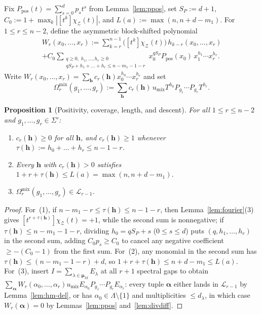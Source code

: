 \documentclass[11pt,a4paper]{article}
\newtheorem{proposition}[theorem]{Proposition}
\theoremstyle{definition}
\theoremstyle{remark}
\newcommand{\cL}{\mathcal{L}}
\newcommand{\cZ}{\mathcal{Z}}
\newcommand{\bmu}{\boldsymbol{\mu}}
\begin{document}
Fix $P_{\mathrm{pos}}(t) = \sum_{s=0}^d p_s t^s$ from Lemma~\ref{lem:ppos}, set $S_P := d + 1$, $C_0 := 1 + \max_k |[t^k]\chi_\cZ(t)|$, and $L(a) := \max(n, n + d - m_1)$. For $1 \le r \le n - 2$, define the asymmetric block-shifted polynomial
\begin{multline}
  W_r(x_0, \dots, x_r) := \sum_{k=r}^{n-1} \bigl([t^k]\chi_\cZ(t)\bigr)\, h_{k-r}(x_0, \dots, x_r) \\
  + C_0 \sum_{\substack{q \ge 0,\; h_1, \dots, h_r \ge 0 \\ q S_P + h_1 + \dots + h_r \le n - m_1 - 1 - r}} x_0^{q S_P} P_{\mathrm{pos}}(x_0)\, x_1^{h_1} \cdots x_r^{h_r}.
  \label{eq:Wr}
\end{multline}
Write $W_r(x_0, \dots, x_r) = \sum_{\mathbf{h}} c_r(\mathbf{h}) x_0^{h_0} \cdots x_r^{h_r}$ and set
\[
  \Omega_r^{\mathrm{mix}}(g_1, \dots, g_r) := \sum_{\mathbf{h}} c_r(\mathbf{h})\, u_{\mathrm{mix}} T^{h_0} P_{g_1} \cdots P_{g_r} T^{h_r}.
\]

\begin{proposition}[Positivity, coverage, length, and descent]
\label{prop:Wr}
For all $1 \le r \le n - 2$ and $g_1, \dots, g_r \in \Sigma'$:
\begin{enumerate}[label=(\arabic*),nosep]
  \item $c_r(\mathbf{h}) \ge 0$ for all $\mathbf{h}$, and $c_r(\mathbf{h}) \ge 1$ whenever $\tau(\mathbf{h}) := h_0 + \dots + h_r \le n - 1 - r$.
  \item Every $\mathbf{h}$ with $c_r(\mathbf{h}) > 0$ satisfies $1 + r + \tau(\mathbf{h}) \le L(a) = \max(n, n + d - m_1)$.
  \item $\Omega_r^{\mathrm{mix}}(g_1, \dots, g_r) \in \cL_{r-1}$.
\end{enumerate}
\end{proposition}
\begin{proof}
For~(1), if $n - m_1 - r \le \tau(\mathbf{h}) \le n - 1 - r$, then Lemma~\ref{lem:fourier}(3) gives $[t^{r+\tau(\mathbf{h})}]\chi_\cZ(t) = +1$, while the second sum is nonnegative; if $\tau(\mathbf{h}) \le n - m_1 - 1 - r$, dividing $h_0 = q S_P + s$ ($0 \le s \le d$) puts $(q, h_1, \dots, h_r)$ in the second sum, adding $C_0 p_s \ge C_0$ to cancel any negative coefficient $\ge -(C_0 - 1)$ from the first sum. For~(2), any monomial in the second sum has $\tau(\mathbf{h}) \le (n - m_1 - 1 - r) + d$, so $1 + r + \tau(\mathbf{h}) \le n + d - m_1 \le L(a)$. For~(3), insert $I = \sum_{\lambda \in \bmu_M} E_\lambda$ at all $r+1$ spectral gaps to obtain $\sum_{\boldsymbol{\alpha}} W_r(\alpha_0, \dots, \alpha_r) u_{\mathrm{mix}} E_{\alpha_0} P_{g_1} \cdots P_{g_r} E_{\alpha_r}$: every tuple $\boldsymbol{\alpha}$ either lands in $\cL_{r-1}$ by Lemma~\ref{lem:hm-del}, or has $\alpha_0 \in \Lambda \setminus \{1\}$ and multiplicities $\le d_\lambda$, in which case $W_r(\boldsymbol{\alpha}) = 0$ by Lemmas~\ref{lem:ppos} and~\ref{lem:divdiff}.
\end{proof}
\end{document}
